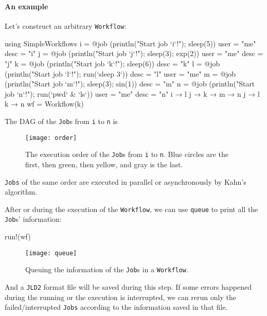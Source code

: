 \begin{frame}
    \frametitle{\subsecname}
    \framesubtitle{An example}

    Let's construct an arbitrary \texttt{Workflow}:
    {\scriptsize
    \begin{algorithmblock}
        \begin{juliaverbatim}
            using SimpleWorkflows
            i = @job (println("Start job `i`!"); sleep(5)) user = "me" desc = "i"
            j = @job (println("Start job `j`!"); sleep(3); exp(2)) user = "me" desc = "j"
            k = @job (println("Start job `k`!"); sleep(6)) desc = "k"
            l = @job (println("Start job `l`!"); run(`sleep 3`)) desc = "l" user = "me"
            m = @job (println("Start job `m`!"); sleep(3); sin(1)) desc = "m"
            n = @job (println("Start job `n`!"); run(`pwd` & `ls`)) user = "me" desc = "n"
            i → l
            j → k → m → n
            j → l
            k → n
            wf = Workflow(k)
        \end{juliaverbatim}
    \end{algorithmblock}
    }

    \framebreak

    The DAG of the \texttt{Job}s from \texttt{i} to \texttt{n} is

    \begin{figure}[H]
        \centering
        \texttt{[image: order]}
        \caption{The execution order of the \texttt{Job}s from \texttt{i} to \texttt{n}.
            Blue circles are the first, then green, then yellow, and gray is the last.}
        \label{fig:order}
    \end{figure}

    \texttt{Jobs} of the same order are executed in parallel or asynchronously by
    Kahn's algorithm.

    \framebreak

    After or during the execution of the \texttt{Workflow}, we can use \texttt{queue} to
    print all the \texttt{Job}s' information:

    {\scriptsize
    \begin{algorithmblock}
        \begin{juliaverbatim}
            run!(wf)
        \end{juliaverbatim}
    \end{algorithmblock}
    }

    \begin{figure}[H]
        \centering
        \texttt{[image: queue]}
        \caption{Queuing the information of the \texttt{Job}s in a \texttt{Workflow}.}
        \label{fig:queue}
    \end{figure}

    And a \texttt{JLD2} format file will be saved during this step. If some errors happened
    during the running or the execution is interrupted, we can rerun only the
    failed/interrupted \texttt{Jobs} according to the information saved in that file.
\end{frame}
